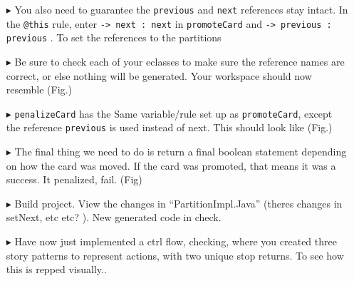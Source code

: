 \begin{itemize}
\item[$\blacktriangleright$] You also need to guarantee the \texttt{previous} and \texttt{next} references stay intact. In the \texttt{@this} rule, enter
\texttt{-> next : next} in \texttt{promoteCard} and \texttt{-> previous : previous} . To set the references to the partitions

\item[$\blacktriangleright$] Be sure to check each of your eclasses to make sure the reference names are correct, or else nothing will be generated. Your
workspace should now resemble (Fig.)

\item[$\blacktriangleright$] \texttt{penalizeCard} has the Same variable/rule set up as \texttt{promoteCard}, except the reference \texttt{previous} is used
instead of next. This should look like (Fig.)

\item[$\blacktriangleright$] The final thing we need to do is return a final boolean statement depending on how the card was moved. If the card was promoted,
that means it was a success. It penalized, fail. (Fig)

\item[$\blacktriangleright$] Build project. View the changes in ``PartitionImpl.Java'' (theres changes in setNext, etc etc? ). New generated code in check.

\item[$\blacktriangleright$] Have now just implemented a ctrl flow, checking, where you created three story patterns to represent actions, with two unique stop
returns. To see how this is repped visually..

 \end{itemize}
 
